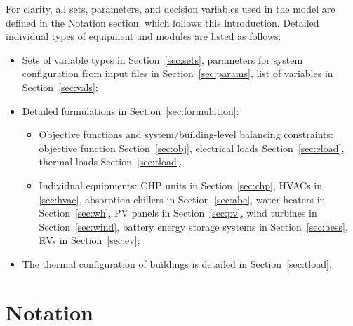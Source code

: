 \documentclass[11pt]{article}
\begin{document}
For clarity, all sets, parameters, and decision variables used in the model are defined in the Notation section, which follows this introduction. Detailed individual types of equipment and modules are listed as follows: 
\begin{itemize}
    \item Sets of variable types in Section~\ref{sec:sets}, parameters for system configuration from input files in Section~\ref{sec:params}, list of variables in Section~\ref{sec:vals};
    \item Detailed formulations in Section~\ref{sec:formulation}: 
    \begin{itemize}
        \item Objective functions and system/building-level balancing constraints: objective function Section~\ref{sec:obj}, electrical loads Section~\ref{sec:eload}, thermal loads Section~\ref{sec:tload}.
        \item Individual equipments: CHP units in Section~\ref{sec:chp}, HVACs in \ref{sec:hvac}, absorption chillers in Section~\ref{sec:abc}, water heaters in Section~\ref{sec:wh}, PV panels in Section~\ref{sec:pv}, wind turbines in Section~\ref{sec:wind}, battery energy storage systems in Section~\ref{sec:bess}, EVs in Section~\ref{sec:ev};
    \end{itemize}
    \item The thermal configuration of buildings is detailed in Section~\ref{sec:tload}.
    
\end{itemize}


\section{Notation}
\label{sec:notation}
\end{document}
